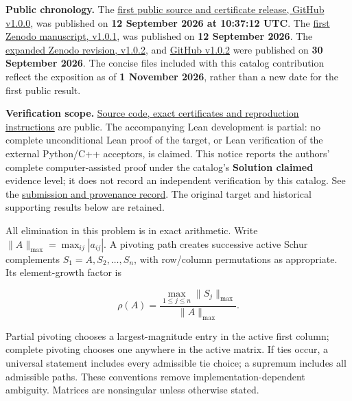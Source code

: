 \documentclass[11pt,a4paper]{article}
\makeatletter
\renewcommand{\subsection}{\Needspace{4\baselineskip}\@startsection{subsection}{2}{0pt}{9pt plus 1pt minus 1pt}{3pt}{\sffamily\bfseries\normalsize\color{ink}}}
\makeatother
\begin{document}
\textbf{Public chronology.} The
\href{https://github.com/hkjtsgmc79-boop/rho5-proof/releases/tag/v1.0.0}{first
public source and certificate release, GitHub v1.0.0}, was published on
\textbf{12 September 2026 at 10:37:12 UTC}. The
\href{https://doi.org/10.5281/zenodo.22727368}{first Zenodo manuscript,
v1.0.1}, was published on \textbf{12 September 2026}. The
\href{https://doi.org/10.5281/zenodo.23057256}{expanded Zenodo revision,
v1.0.2}, and
\href{https://github.com/hkjtsgmc79-boop/rho5-proof/releases/tag/v1.0.2}{GitHub
v1.0.2} were published on \textbf{30 September 2026}. The concise files
included with this catalog contribution reflect the exposition as of
\textbf{1 November 2026}, rather than a new date for the first public
result.

\textbf{Verification scope.}
\href{https://github.com/hkjtsgmc79-boop/rho5-proof}{Source code, exact
certificates and reproduction instructions} are public. The accompanying
Lean development is partial: no complete unconditional Lean proof of the
target, or Lean verification of the external Python/C++ acceptors, is
claimed. This notice reports the authors' complete computer-assisted
proof under the catalog's \textbf{Solution claimed} evidence level; it
does not record an independent verification by this catalog. See the
\href{https://github.com/ajt60gaibb/OpenProblemsInNLA/blob/main/references/ma-wu-rho5-2026-11-01/README.md}{submission
and provenance record}. The original target and historical supporting
results below are retained.

\newpage

\subsection{Context and notation}\label{context-and-notation}

All elimination in this problem is in exact arithmetic. Write
\(\|A\|_{\max}=\max_{ij}|a_{ij}|\). A pivoting path creates successive
active Schur complements \(S_1=A,S_2,\ldots,S_n\), with row/column
permutations as appropriate. Its element-growth factor is

\[\rho(A)=\frac{\max_{1\leq j\leq n}\|S_j\|_{\max}}{\|A\|_{\max}}.\]

Partial pivoting chooses a largest-magnitude entry in the active first
column; complete pivoting chooses one anywhere in the active matrix. If
ties occur, a universal statement includes every admissible tie choice;
a supremum includes all admissible paths. These conventions remove
implementation-dependent ambiguity. Matrices are nonsingular unless
otherwise stated.
\end{document}
